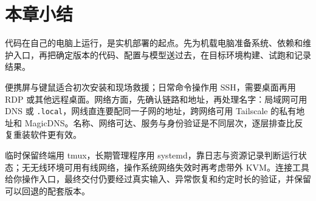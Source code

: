 \section{本章小结}
\begin{conclusion}
代码在自己的电脑上运行，是实机部署的起点。先为机载电脑准备系统、依赖和维护入口，再把确定版本的代码、配置与模型送过去，在目标环境构建、试跑和记录结果。

便携屏与键鼠适合初次安装和现场救援；日常命令操作用 SSH，需要桌面再用 RDP 或其他远程桌面。网络方面，先确认链路和地址，再处理名字：局域网可用 DNS 或 \texttt{.local}，网线直连要配同一子网的地址，跨网络可用 Tailscale 的私有地址和 MagicDNS。名称、网络可达、服务与身份验证是不同层次，逐层排查比反复重装软件更有效。

临时保留终端用 tmux，长期管理程序用 systemd，靠日志与资源记录判断运行状态；无无线环境可用有线网络，操作系统网络失效时再考虑带外 KVM。连接工具给你操作入口，最终交付仍要经过真实输入、异常恢复和约定时长的验证，并保留可以回退的配套版本。
\end{conclusion}

